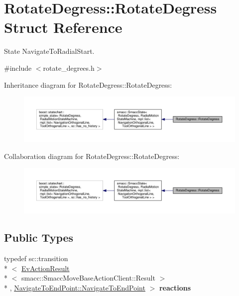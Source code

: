 \hypertarget{structRotateDegress_1_1RotateDegress}{\section{Rotate\-Degress\-:\-:Rotate\-Degress Struct Reference}
\label{structRotateDegress_1_1RotateDegress}
}


State Navigate\-To\-Radial\-Start.  




{\ttfamily \#include $<$rotate\-\_\-degrees.\-h$>$}



Inheritance diagram for Rotate\-Degress\-:\-:Rotate\-Degress\-:
\nopagebreak
\begin{figure}[H]
\begin{center}
\leavevmode
\includegraphics[width=350pt]{structRotateDegress_1_1RotateDegress__inherit__graph}
\end{center}
\end{figure}


Collaboration diagram for Rotate\-Degress\-:\-:Rotate\-Degress\-:
\nopagebreak
\begin{figure}[H]
\begin{center}
\leavevmode
\includegraphics[width=350pt]{structRotateDegress_1_1RotateDegress__coll__graph}
\end{center}
\end{figure}
\subsection*{Public Types}
\begin{DoxyCompactItemize}
\item 
\hypertarget{structRotateDegress_1_1RotateDegress_ae589629aa225feb6a2bc2bc702bd088f}{typedef sc\-::transition\\*
$<$ \hyperlink{structsmacc_1_1EvActionResult}{Ev\-Action\-Result}\\*
$<$ smacc\-::\-Smacc\-Move\-Base\-Action\-Client\-::\-Result $>$\\*
, \hyperlink{structNavigateToEndPoint_1_1NavigateToEndPoint}{Navigate\-To\-End\-Point\-::\-Navigate\-To\-End\-Point} $>$ {\bfseries reactions}}\label{structRotateDegress_1_1RotateDegress_ae589629aa225feb6a2bc2bc702bd088f}

\end{DoxyCompactItemize}
